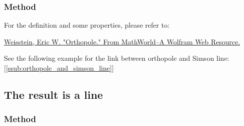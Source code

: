
\subsubsection{Method } %
\label{ssub:method_triangle_orthopole}

For the definition and some properties, please refer to:

\begin{flushright}
\small
\href{ https://mathworld.wolfram.com/Orthopole.html}{Weisstein, Eric W. "Orthopole." From MathWorld--A Wolfram Web Resource.}
\end{flushright}

See the following example for the link between orthopole and Simson line: [\ref{ssub:orthopole_and_simson_line}]

\begin{tkzexample}[latex=.5\textwidth]
\begin{center}
\end{center}
\end{tkzexample}





\subsection{The result is a line} %

\subsubsection{Method } %
\label{ssub:method_imeth_triangle_symmedian__line}

